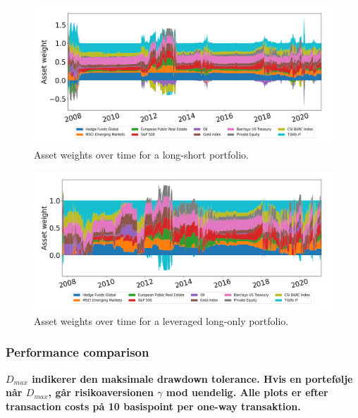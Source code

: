 \begin{figure}[H]
    \centering
    \includegraphics[width=1\textwidth]{analysis/portfolio_exercise/images/mle/weights_ls.png}
    \caption[Asset weights over time for a long-short portfolio]{Asset weights over time for a long-short portfolio.}
    \label{fig:MPC_port_weights_ls}
\end{figure}

\begin{figure}[H]
    \centering
    \includegraphics[width=1\textwidth]{analysis/portfolio_exercise/images/mle/weights_llo.png}
    \caption[Asset weights over time for a leveraged long-only portfolio]{Asset weights over time for a leveraged long-only portfolio.}
    \label{fig:MPC_port_weights_llo}
\end{figure}

\subsubsection*{Performance comparison}

\textbf{$D_{max}$ indikerer den maksimale drawdown tolerance. Hvis en portefølje når $D_{max}$, går risikoaversionen $\gamma$ mod uendelig. Alle plots er efter transaction costs på 10 basispoint per one-way transaktion.}


